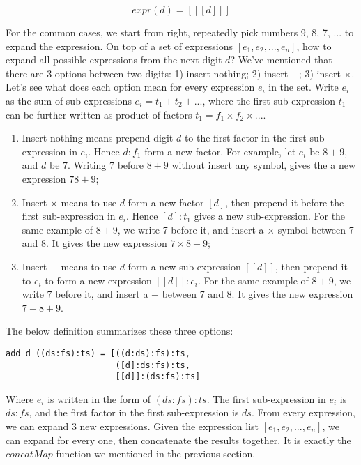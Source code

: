 \documentclass{article}
\begin{document}
\[
expr(d) = [[[d]]]
\]

For the common cases, we start from right, repeatedly pick numbers 9, 8, 7, ... to expand the expression. On top of a set of expressions $[e_1, e_2, ..., e_n]$, how to expand all possible expressions from the next digit $d$? We've mentioned that there are 3 options between two digits: 1) insert nothing; 2) insert +; 3) insert $\times$. Let's see what does each option mean for every expression $e_i$ in the set. Write $e_i$ as the sum of sub-expressions $e_i = t_1 + t_2 + ...$, where the first sub-expression $t_1$ can be further written as product of factors $t_1 = f_1 \times f_2 \times ...$.

\begin{enumerate}
\item Insert nothing means prepend digit $d$ to the first factor in the first sub-expression in $e_i$. Hence $d:f_1$ form a new factor. For example, let $e_i$ be $8 + 9$, and $d$ be 7. Writing 7 before $8 + 9$ without insert any symbol, gives the a new expression $78 + 9$;

\item Insert $\times$ means to use $d$ form a new factor $[d]$, then prepend it before the first sub-expression in $e_i$. Hence $[d]:t_1$ gives a new sub-expression. For the same example of $8 + 9$, we write 7 before it, and insert a $\times$ symbol between 7 and 8. It gives the new expression $7 \times 8 + 9$;

\item Insert + means to use $d$ form a new sub-expression $[[d]]$, then prepend it to $e_i$ to form a new expression $[[d]]:e_i$. For the same example of $8 + 9$, we write 7 before it, and insert a + between 7 and 8. It gives the new expression $7 + 8 + 9$.
\end{enumerate}

The below definition summarizes these three options:

\lstset{frame = none}
\begin{lstlisting}
add d ((ds:fs):ts) = [((d:ds):fs):ts,
                      ([d]:ds:fs):ts,
                      [[d]]:(ds:fs):ts]
\end{lstlisting}

Where $e_i$ is written in the form of $(ds:fs):ts$. The first sub-expression in $e_i$ is $ds:fs$, and the first factor in the first sub-expression is $ds$. From every expression, we can expand 3 new expressions. Given the expression list $[e_1, e_2, ..., e_n]$, we can expand for every one, then concatenate the results together. It is exactly the $concatMap$ function we mentioned in the previous section.
\end{document}
